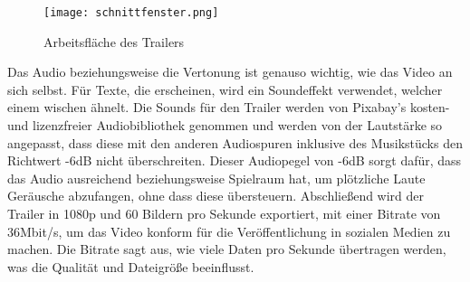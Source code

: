 \begin{figure}[H]
    \centering
    \texttt{[image: schnittfenster.png]}
    \caption{Arbeitsfläche des Trailers}
\end{figure}

Das Audio beziehungsweise die Vertonung ist genauso wichtig, wie das Video an sich selbst.
Für Texte, die erscheinen, wird ein Soundeffekt verwendet, welcher einem wischen ähnelt.
Die Sounds für den Trailer werden von Pixabay’s kosten- und lizenzfreier Audiobibliothek genommen und werden von der
Lautstärke so angepasst, dass diese mit den anderen Audiospuren inklusive des Musikstücks den Richtwert -6dB nicht überschreiten.
Dieser Audiopegel von -6dB sorgt dafür, dass das Audio ausreichend  beziehungsweise Spielraum
hat, um plötzliche Laute Geräusche abzufangen, ohne dass diese übersteuern.
Abschließend wird der Trailer in 1080p und 60 Bildern pro Sekunde exportiert, mit einer Bitrate von 36Mbit/s, um das Video konform für die Veröffentlichung in sozialen Medien zu machen.
Die Bitrate sagt aus, wie viele Daten pro Sekunde übertragen werden, was die Qualität und Dateigröße beeinflusst.



\renewcommand{\kapitelautor}{}
